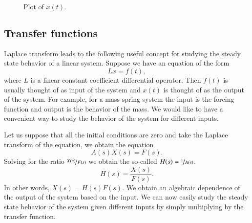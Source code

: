 \begin{example}
\begin{figure}[h!t]
\capstart
\begin{center}
\caption{Plot of $x(t)$.\label{lt:heavisideexfig}}
\end{center}
\end{figure}
\end{example}

\subsection{Transfer functions}

Laplace transform leads to the following useful concept for studying the
steady state behavior of a linear system.  Suppose we have an equation of the
form
\begin{equation*}
L x = f(t) ,
\end{equation*}
where $L$ is a linear constant coefficient differential operator.
Then $f(t)$ is usually thought of as input of the system and $x(t)$ is
thought of as the output of the system.  For example, for a mass-spring
system the input is the forcing function and output is the behavior of the
mass.  We would like to have a convenient way to study the behavior of
the system for different inputs.

Let us suppose that
all the initial conditions are zero and take the Laplace transform
of the equation, we obtain the equation
\begin{equation*}
A(s) X(s) = F(s) .
\end{equation*}
Solving for the ratio $\nicefrac{X(s)}{F(s)}$ we obtain the so-called
\emph{}
$H(s) = \nicefrac{1}{A(s)}$.
\begin{equation*}
H(s) = \frac{X(s)}{F(s)} .
\end{equation*}
In other words, $X(s) = H(s) F(s)$.  We obtain an algebraic dependence of
the output of the system based on the input.  We can now easily study the
steady state behavior of the system given different inputs by simply
multiplying by the transfer function.

